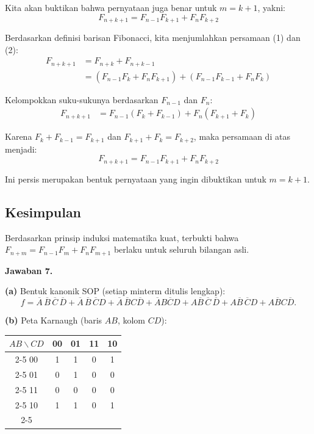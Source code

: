\documentclass[11pt,a4paper]{article}
\newcommand{\jawab}[1]{\vspace{4pt}\noindent\textbf{Jawaban #1.}\par\nobreak\vspace{2pt}}
\newcommand{\Comp}[1]{\overline{#1}}
\begin{document}
Kita akan buktikan bahwa pernyataan juga benar untuk $m = k+1$, yakni:
\[ F_{n+k+1} = F_{n-1}F_{k+1} + F_nF_{k+2} \]

Berdasarkan definisi barisan Fibonacci, kita menjumlahkan persamaan (1) dan (2):
\begin{align*}
F_{n+k+1} &= F_{n+k} + F_{n+k-1} \\
&= (F_{n-1}F_k + F_nF_{k+1}) + (F_{n-1}F_{k-1} + F_nF_k)
\end{align*}

Kelompokkan suku-sukunya berdasarkan $F_{n-1}$ dan $F_n$:
\begin{align*}
F_{n+k+1} &= F_{n-1}(F_k + F_{k-1}) + F_n(F_{k+1} + F_k)
\end{align*}

Karena $F_k + F_{k-1} = F_{k+1}$ dan $F_{k+1} + F_k = F_{k+2}$, maka persamaan di atas menjadi:
\[ F_{n+k+1} = F_{n-1}F_{k+1} + F_nF_{k+2} \]

Ini persis merupakan bentuk pernyataan yang ingin dibuktikan untuk $m = k+1$.

\subsection*{Kesimpulan}
Berdasarkan prinsip induksi matematika kuat, terbukti bahwa $F_{n+m} = F_{n-1}F_m + F_nF_{m+1}$ berlaku untuk seluruh bilangan asli.

\jawab{7}
\textbf{(a)} Bentuk kanonik SOP (setiap minterm ditulis lengkap):
\[
f = \Comp{A}\,\Comp{B}\,\Comp{C}\,\Comp{D}
  + \Comp{A}\,\Comp{B}\,\Comp{C}D
  + \Comp{A}\,\Comp{B}C\Comp{D}
  + \Comp{A}B\Comp{C}D
  + A\Comp{B}\,\Comp{C}\,\Comp{D}
  + A\Comp{B}\,\Comp{C}D
  + A\Comp{B}C\Comp{D}.
\]

\textbf{(b)} Peta Karnaugh (baris $AB$, kolom $CD$):

\begin{center}
\begin{tabular}{c|c|c|c|c|}
\multicolumn{1}{c}{$AB \backslash CD$} & \multicolumn{1}{c}{00} & \multicolumn{1}{c}{01} & \multicolumn{1}{c}{11} & \multicolumn{1}{c}{10}\\
\cline{2-5}
00 & 1 & 1 & 0 & 1\\ \cline{2-5}
01 & 0 & 1 & 0 & 0\\ \cline{2-5}
11 & 0 & 0 & 0 & 0\\ \cline{2-5}
10 & 1 & 1 & 0 & 1\\ \cline{2-5}
\end{tabular}
\end{center}
\end{document}
